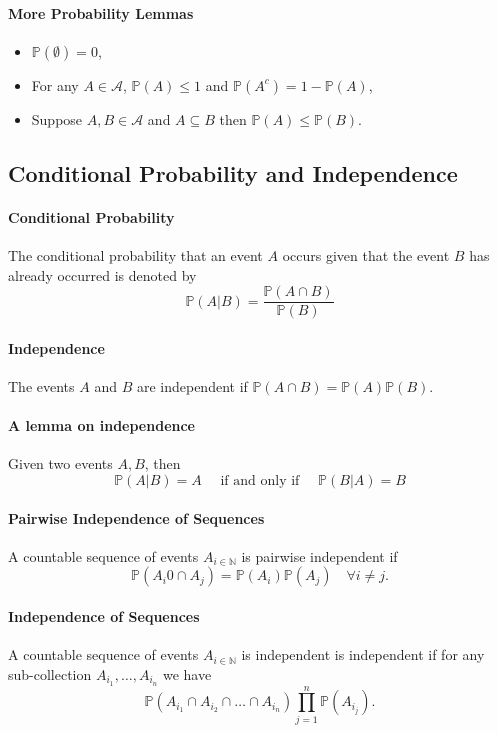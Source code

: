\paragraph{More Probability Lemmas}
\begin{itemize}
    \item \(\mathbb{P} (\emptyset) = 0\),
    \item For any \(A\in\mathcal{A}\), \(\mathbb{P}(A) \leq 1\) and \(\mathbb{P}(A^c) = 1-\mathbb{P}(A)\),
    \item Suppose \(A, B\in\mathcal{A}\) and \(A\subseteq B\) then \(\mathbb{P}(A) \leq \mathbb{P}(B) \).
\end{itemize}

\subsection{Conditional Probability and Independence}

\paragraph{Conditional Probability}
The conditional probability that an event \(A\) occurs given that the event
\(B\) has already occurred is denoted by 
\[
    \mathbb{P} (A|B) = \frac{\mathbb{P} (A \cap B)}{\mathbb{P} (B)}
\]

\paragraph{Independence}
The events \(A\) and \(B\) are independent if
\(
    \mathbb{P}(A\cap B) = \mathbb{P}(A)\mathbb{P}(B).
\)

\paragraph{A lemma on independence}
Given two events \(A, B\), then 
\[
    \mathbb{P}(A | B) = A
    \quad \text{ if and only if } \quad
    \mathbb{P}(B | A) = B
\]

\paragraph{Pairwise Independence of Sequences}
A countable sequence of events \(A_{i\in\mathbb{N}}\) is pairwise independent
if  \[
    \mathbb{P}(A_i0 \cap A_j) = \mathbb{P} (A_i) \mathbb{P}(A_j) \quad
    \forall i\neq j.
\]

\paragraph{Independence of Sequences}
A countable sequence of events \(A_{i\in\mathbb{N}}\) is independent is
independent if for any sub-collection \(A_{i_1},\dots, A_{i_n}\) we have
\[
    \mathbb{P}(A_{i_1} \cap A_{i_2}\cap\dots\cap A_{i_n})
    \prod_{j=1}^{n} \mathbb{P}(A_{i_j}).
\]
